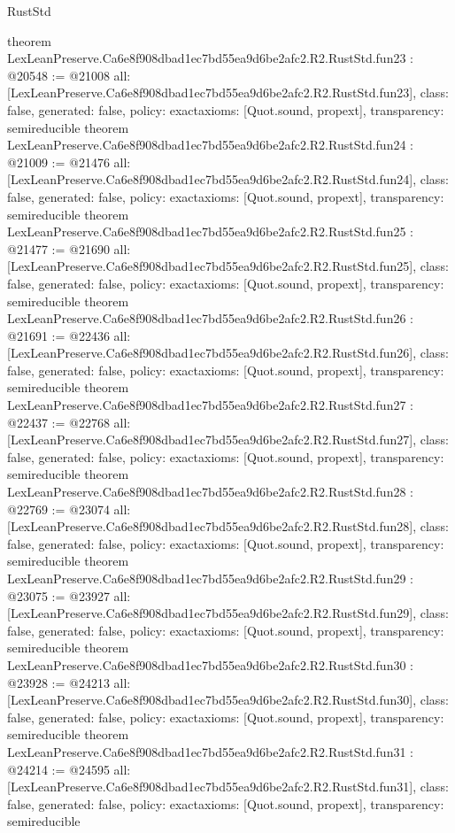 \begin{lexlean}{RustStd}
\begin{coremodule}
{}
theorem LexLeanPreserve.Ca6e8f908dbad1ec7bd55ea9d6be2afc2.R2.RustStd.fun23 : @20548 := @21008 {
  all: [LexLeanPreserve.Ca6e8f908dbad1ec7bd55ea9d6be2afc2.R2.RustStd.fun23],
  class: false,
  generated: false,
  policy: exact{axioms: [Quot.sound, propext]},
  transparency: semireducible
}
theorem LexLeanPreserve.Ca6e8f908dbad1ec7bd55ea9d6be2afc2.R2.RustStd.fun24 : @21009 := @21476 {
  all: [LexLeanPreserve.Ca6e8f908dbad1ec7bd55ea9d6be2afc2.R2.RustStd.fun24],
  class: false,
  generated: false,
  policy: exact{axioms: [Quot.sound, propext]},
  transparency: semireducible
}
theorem LexLeanPreserve.Ca6e8f908dbad1ec7bd55ea9d6be2afc2.R2.RustStd.fun25 : @21477 := @21690 {
  all: [LexLeanPreserve.Ca6e8f908dbad1ec7bd55ea9d6be2afc2.R2.RustStd.fun25],
  class: false,
  generated: false,
  policy: exact{axioms: [Quot.sound, propext]},
  transparency: semireducible
}
theorem LexLeanPreserve.Ca6e8f908dbad1ec7bd55ea9d6be2afc2.R2.RustStd.fun26 : @21691 := @22436 {
  all: [LexLeanPreserve.Ca6e8f908dbad1ec7bd55ea9d6be2afc2.R2.RustStd.fun26],
  class: false,
  generated: false,
  policy: exact{axioms: [Quot.sound, propext]},
  transparency: semireducible
}
theorem LexLeanPreserve.Ca6e8f908dbad1ec7bd55ea9d6be2afc2.R2.RustStd.fun27 : @22437 := @22768 {
  all: [LexLeanPreserve.Ca6e8f908dbad1ec7bd55ea9d6be2afc2.R2.RustStd.fun27],
  class: false,
  generated: false,
  policy: exact{axioms: [Quot.sound, propext]},
  transparency: semireducible
}
theorem LexLeanPreserve.Ca6e8f908dbad1ec7bd55ea9d6be2afc2.R2.RustStd.fun28 : @22769 := @23074 {
  all: [LexLeanPreserve.Ca6e8f908dbad1ec7bd55ea9d6be2afc2.R2.RustStd.fun28],
  class: false,
  generated: false,
  policy: exact{axioms: [Quot.sound, propext]},
  transparency: semireducible
}
theorem LexLeanPreserve.Ca6e8f908dbad1ec7bd55ea9d6be2afc2.R2.RustStd.fun29 : @23075 := @23927 {
  all: [LexLeanPreserve.Ca6e8f908dbad1ec7bd55ea9d6be2afc2.R2.RustStd.fun29],
  class: false,
  generated: false,
  policy: exact{axioms: [Quot.sound, propext]},
  transparency: semireducible
}
theorem LexLeanPreserve.Ca6e8f908dbad1ec7bd55ea9d6be2afc2.R2.RustStd.fun30 : @23928 := @24213 {
  all: [LexLeanPreserve.Ca6e8f908dbad1ec7bd55ea9d6be2afc2.R2.RustStd.fun30],
  class: false,
  generated: false,
  policy: exact{axioms: [Quot.sound, propext]},
  transparency: semireducible
}
theorem LexLeanPreserve.Ca6e8f908dbad1ec7bd55ea9d6be2afc2.R2.RustStd.fun31 : @24214 := @24595 {
  all: [LexLeanPreserve.Ca6e8f908dbad1ec7bd55ea9d6be2afc2.R2.RustStd.fun31],
  class: false,
  generated: false,
  policy: exact{axioms: [Quot.sound, propext]},
  transparency: semireducible
}
\end{coremodule}
\end{lexlean}
